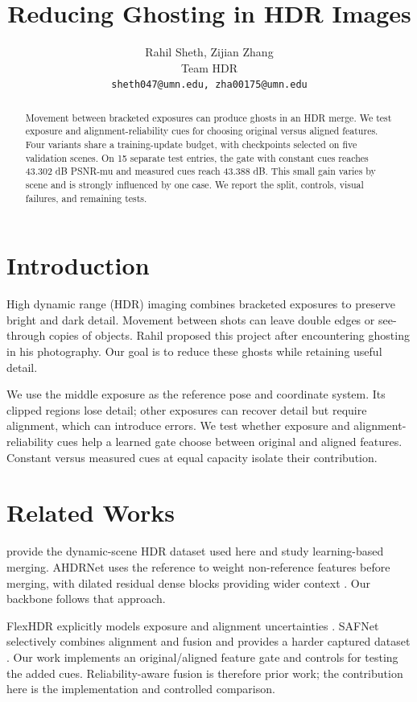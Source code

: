 \documentclass{article}
\title{Reducing Ghosting in HDR Images}
\author{Rahil Sheth, Zijian Zhang \\
Team HDR \\
\texttt{sheth047@umn.edu, zha00175@umn.edu}}
\begin{document}
\maketitle

\begin{abstract}
Movement between bracketed exposures can produce ghosts in an HDR merge. We test exposure and alignment-reliability cues for choosing original versus aligned features. Four variants share a training-update budget, with checkpoints selected on five validation scenes. On 15 separate test entries, the gate with constant cues reaches 43.302 dB PSNR-mu and measured cues reach 43.388 dB. This small gain varies by scene and is strongly influenced by one case. We report the split, controls, visual failures, and remaining tests.
\end{abstract}

\section{Introduction}
High dynamic range (HDR) imaging combines bracketed exposures to preserve bright and dark detail. Movement between shots can leave double edges or see-through copies of objects. Rahil proposed this project after encountering ghosting in his photography. Our goal is to reduce these ghosts while retaining useful detail.

We use the middle exposure as the reference pose and coordinate system. Its clipped regions lose detail; other exposures can recover detail but require alignment, which can introduce errors. We test whether exposure and alignment-reliability cues help a learned gate choose between original and aligned features. Constant versus measured cues at equal capacity isolate their contribution.

\section{Related Works}
\citet{kalantari2017} provide the dynamic-scene HDR dataset used here and study learning-based merging. AHDRNet uses the reference to weight non-reference features before merging, with dilated residual dense blocks providing wider context \citep{yan2019}. Our backbone follows that approach.

FlexHDR explicitly models exposure and alignment uncertainties \citep{catley2022}. SAFNet selectively combines alignment and fusion and provides a harder captured dataset \citep{kong2024}. Our work implements an original/aligned feature gate and controls for testing the added cues. Reliability-aware fusion is therefore prior work; the contribution here is the implementation and controlled comparison.
\end{document}
